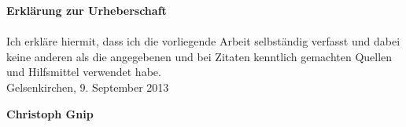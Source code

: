 
\Large{\textbf{Erklärung zur Urheberschaft }}\\
%
\\
\normalsize
Ich erkläre hiermit, dass ich die vorliegende Arbeit selbständig verfasst und dabei keine  anderen  als die  angegebenen und bei Zitaten kenntlich gemachten Quellen und Hilfsmittel verwendet habe.\\

\vspace{1cm}
Gelsenkirchen, 9. September 2013

\vspace{2cm}
\textbf{Christoph Gnip}
\newpage